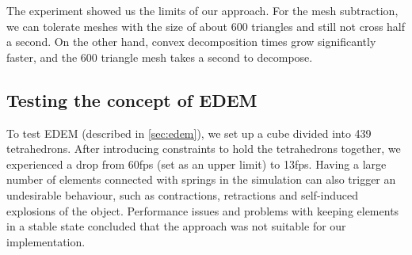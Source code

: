 The experiment showed us the limits of our approach. For the mesh subtraction, we can tolerate meshes with the size of about 600 triangles and still not cross half a second. On the other hand, convex decomposition times grow significantly faster, and the 600 triangle mesh takes a second to decompose.


\subsection{Testing the concept of EDEM}
To test EDEM (described in \cref{sec:edem}), we set up a cube divided into 439 tetrahedrons. After introducing constraints to hold the tetrahedrons together, we experienced a drop from 60fps (set as an upper limit) to 13fps. Having a large number of elements connected with springs in the simulation can also trigger an undesirable behaviour, such as contractions, retractions and self-induced explosions of the object. Performance issues and problems with keeping elements in a stable state concluded that the approach was not suitable for our implementation.




